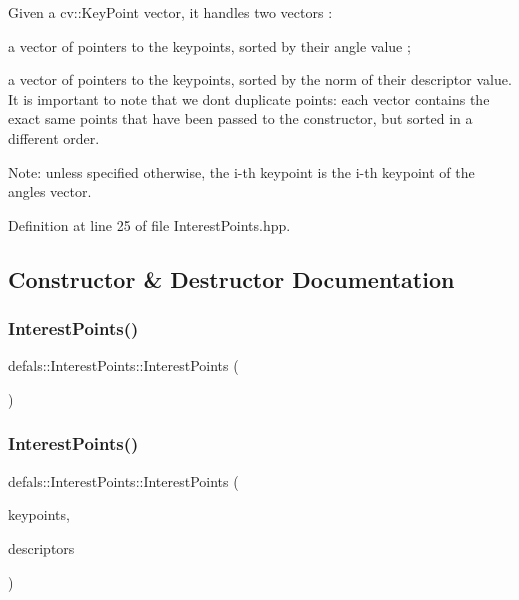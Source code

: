 Given a cv\+::\+Key\+Point vector, it handles two vectors \+:
\begin{DoxyItemize}
\item a vector of pointers to the keypoints, sorted by their angle value ;
\item a vector of pointers to the keypoints, sorted by the norm of their descriptor value. It is important to note that we don\textquotesingle{}t duplicate points\+: each vector contains the exact same points that have been passed to the constructor, but sorted in a different order.
\end{DoxyItemize}

Note\+: unless specified otherwise, the i-\/th keypoint is the i-\/th keypoint of the angles vector. 

Definition at line 25 of file Interest\+Points.\+hpp.



\subsection{Constructor \& Destructor Documentation}
\mbox{\label{classdefals_1_1_interest_points_a79081c5109be7071736a9676202d1290}} 
\subsubsection{\texorpdfstring{Interest\+Points()}{InterestPoints()}\hspace{0.1cm}{\footnotesize\ttfamily [1/2]}}
{\footnotesize\ttfamily defals\+::\+Interest\+Points\+::\+Interest\+Points (\begin{DoxyParamCaption}{ }\end{DoxyParamCaption})\hspace{0.3cm}{\ttfamily [default]}}

\mbox{\label{classdefals_1_1_interest_points_a0c1cffe13d409f76602eaec6f3f46a4b}} 
\subsubsection{\texorpdfstring{Interest\+Points()}{InterestPoints()}\hspace{0.1cm}{\footnotesize\ttfamily [2/2]}}
{\footnotesize\ttfamily defals\+::\+Interest\+Points\+::\+Interest\+Points (\begin{DoxyParamCaption}\item[{const std\+::vector$<$ cv\+::\+Key\+Point $>$ \&}]{keypoints,  }\item[{const cv\+::\+Mat \&}]{descriptors }\end{DoxyParamCaption})}



